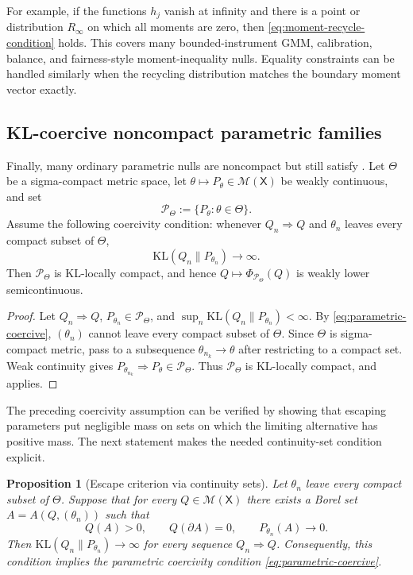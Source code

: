 \documentclass[11pt]{article}
\newcommand{\KL}{\mathrm{KL}}
\newcommand{\Pcal}{\mathcal{P}}
\newcommand{\X}{\mathsf{X}}
\newcommand{\M}{\mathcal{M}}
\newtheorem{proposition}[theorem]{Proposition}
\theoremstyle{definition}
\theoremstyle{definition}
\begin{document}
For example, if the functions \(h_j\) vanish at infinity and there is a point or distribution \(R_\infty\) on which all moments are zero, then \eqref{eq:moment-recycle-condition} holds.  This covers many bounded-instrument GMM, calibration, balance, and fairness-style moment-inequality nulls.  Equality constraints can be handled similarly when the recycling distribution matches the boundary moment vector exactly.

\subsection{KL-coercive noncompact parametric families}

Finally, many ordinary parametric nulls are noncompact but still satisfy .  Let \(\Theta\) be a sigma-compact metric space, let \(\theta\mapsto P_\theta\in\M(\X)\) be weakly continuous, and set
\[
  \Pcal_\Theta:=\{P_\theta:\theta\in\Theta\}.
\]
Assume the following coercivity condition: whenever \(Q_n\Rightarrow Q\) and \(\theta_n\) leaves every compact subset of \(\Theta\),
\begin{equation}\label{eq:parametric-coercive}
  \KL(Q_n\|P_{\theta_n})\to\infty.
\end{equation}
Then \(\Pcal_\Theta\) is KL-locally compact, and hence \(Q\mapsto\Phi_{\Pcal_\Theta}(Q)\) is weakly lower semicontinuous.

\begin{proof}
Let \(Q_n\Rightarrow Q\), \(P_{\theta_n}\in\Pcal_\Theta\), and \(\sup_n\KL(Q_n\|P_{\theta_n})<\infty\).  By \eqref{eq:parametric-coercive}, \((\theta_n)\) cannot leave every compact subset of \(\Theta\).  Since \(\Theta\) is sigma-compact metric, pass to a subsequence \(\theta_{n_k}\to\theta\) after restricting to a compact set.  Weak continuity gives \(P_{\theta_{n_k}}\Rightarrow P_\theta\in\Pcal_\Theta\).  Thus \(\Pcal_\Theta\) is KL-locally compact, and  applies.
\end{proof}


The preceding coercivity assumption can be verified by showing that escaping parameters put negligible mass on sets on which the limiting alternative has positive mass.  The next statement makes the needed continuity-set condition explicit.

\begin{proposition}[Escape criterion via continuity sets]\label{prop:escape-continuity}
Let \(\theta_n\) leave every compact subset of \(\Theta\).  Suppose that for every \(Q\in\M(\X)\) there exists a Borel set \(A=A(Q,(\theta_n))\) such that
\[
  Q(A)>0,\qquad Q(\partial A)=0,
  \qquad P_{\theta_n}(A)\to0.
\]
Then \(\KL(Q_n\|P_{\theta_n})\to\infty\) for every sequence \(Q_n\Rightarrow Q\).  Consequently, this condition implies the parametric coercivity condition \eqref{eq:parametric-coercive}.
\end{proposition}
\end{document}
